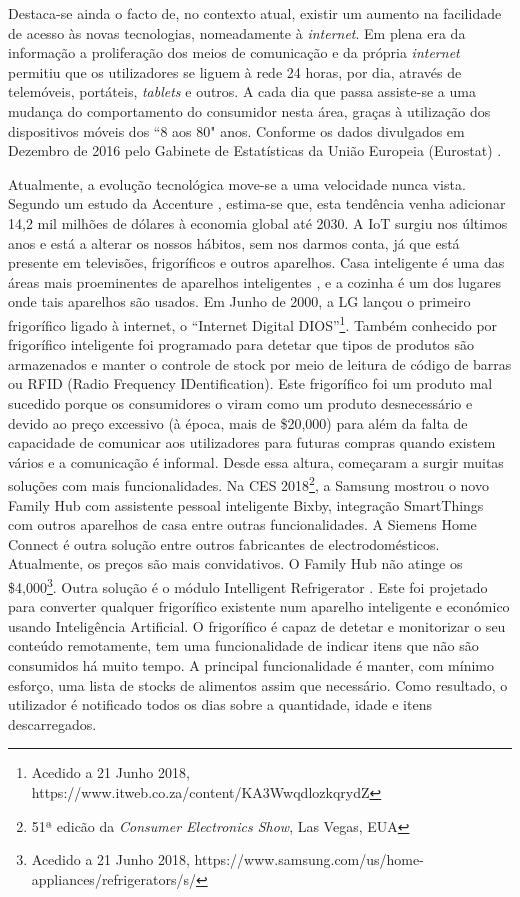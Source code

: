Destaca-se ainda o facto de, no contexto atual, existir um aumento na facilidade de acesso às novas tecnologias, nomeadamente à \textit{internet}. Em plena era da informação a proliferação dos meios de comunicação e da própria \textit{internet} permitiu que os utilizadores se liguem à rede 24 horas, por dia, através de telemóveis, portáteis, \textit{tablets} e outros. A cada dia que passa assiste-se a uma mudança do comportamento do consumidor nesta área, graças à utilização dos dispositivos móveis dos ``8 aos 80" anos. Conforme os dados divulgados em Dezembro de 2016 pelo Gabinete de Estatísticas da União Europeia (Eurostat) \cite{eurostat:internetAccess2016}.

Atualmente, a evolução tecnológica move-se a uma velocidade nunca vista. %
Segundo um estudo da Accenture \cite{Accenture:2016}, estima-se que, esta tendência venha adicionar 14,2 mil milhões de dólares à economia global até 2030. A IoT surgiu nos últimos anos e está a alterar os nossos hábitos, sem nos darmos conta, já que está presente em televisões, frigoríficos e outros aparelhos. Casa inteligente é uma das áreas mais proeminentes de aparelhos inteligentes \cite{miller2015internet}, e a cozinha é um dos lugares onde tais aparelhos são usados.
Em Junho de 2000, a LG lançou o primeiro frigorífico ligado à internet, o ``Internet Digital DIOS''\footnote{Acedido a 21 Junho 2018, https://www.itweb.co.za/content/KA3WwqdlozkqrydZ}. Também conhecido por frigorífico inteligente foi programado para detetar que tipos de produtos são armazenados e manter o controle de stock por meio de leitura de código de barras ou RFID (Radio Frequency IDentification). Este frigorífico foi um produto mal sucedido porque os consumidores o viram como um produto desnecessário e devido ao preço excessivo (à época, mais de \$20,000) para além da falta de capacidade de comunicar aos utilizadores para futuras compras quando existem vários e a comunicação é informal. Desde essa altura, começaram a surgir muitas soluções com mais funcionalidades. Na CES 2018\footnote{51ª edicão da \textit{Consumer Electronics Show}, Las Vegas, EUA}, a Samsung mostrou o novo Family Hub com assistente pessoal inteligente Bixby, integração SmartThings com outros aparelhos de casa entre outras funcionalidades. A Siemens Home Connect é outra solução entre outros fabricantes de electrodomésticos. Atualmente, os preços são mais convidativos. O Family Hub não atinge os \$4,000\footnote{Acedido a 21 Junho 2018, https://www.samsung.com/us/home-appliances/refrigerators/s/}. Outra solução é o módulo Intelligent Refrigerator \cite{shweta2017intelligent}. Este foi projetado para converter qualquer frigorífico existente num aparelho inteligente e económico usando Inteligência Artificial. O frigorífico é capaz de detetar e monitorizar o seu conteúdo remotamente, tem uma funcionalidade de indicar itens que não são consumidos há muito tempo. A principal funcionalidade é manter, com mínimo esforço, uma lista de stocks de alimentos assim que necessário. Como resultado, o utilizador é notificado todos os dias sobre a quantidade, idade e itens descarregados. 
%
%
